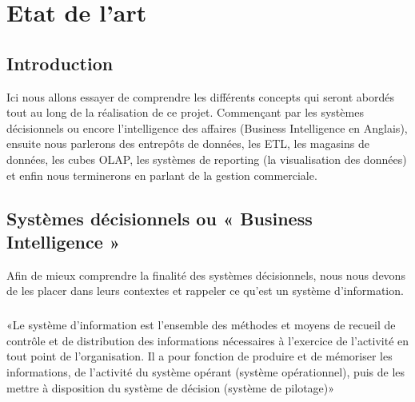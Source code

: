 \chapter{Etat de l'art}

\section*{Introduction}%
Ici nous allons essayer de comprendre les différents concepts qui seront abordés tout au long de la réalisation de ce projet. Commençant par les systèmes décisionnels ou encore l’intelligence des affaires (Business Intelligence en Anglais), ensuite nous parlerons des entrepôts de données, les ETL, les magasins de données, les cubes OLAP, les systèmes de reporting (la visualisation des données) et enfin nous terminerons en parlant de la gestion commerciale.


\section{Systèmes décisionnels ou « Business Intelligence »}
Afin de mieux comprendre la finalité des systèmes décisionnels, nous nous devons de les placer dans leurs contextes et rappeler ce qu’est un système d’information.

\paragraph{}
«Le système d’information est l’ensemble des méthodes et moyens de recueil de contrôle et de distribution des informations nécessaires à l’exercice de l’activité en tout point de l’organisation. Il a pour fonction de produire et de mémoriser les informations, de l’activité du système opérant (système opérationnel), puis de les mettre à disposition du système de décision (système de pilotage)» \cite{book:3}
